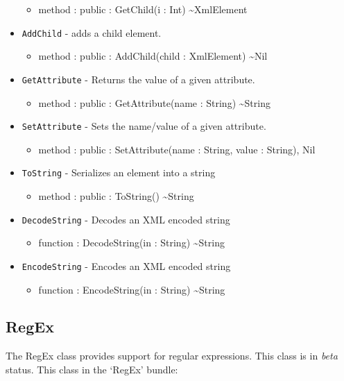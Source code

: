 \documentclass[11pt]{article}
\begin{document}
\begin{itemize}
  \begin{itemize}
  \item method : public : GetChild(i : Int) \textasciitilde XmlElement
  \end{itemize}
\item \texttt{AddChild} - adds a child element.
  \begin{itemize}
  \item method : public : AddChild(child : XmlElement) \textasciitilde Nil
  \end{itemize}
\item \texttt{GetAttribute} - Returns the value of a given attribute.
  \begin{itemize}
  \item method : public : GetAttribute(name : String) \textasciitilde String
  \end{itemize}
\item \texttt{SetAttribute} - Sets the name/value of a given
  attribute.
  \begin{itemize}
  \item method : public : SetAttribute(name : String, value : String),
    Nil
  \end{itemize}
\item \texttt{ToString} - Serializes an element into a string
  \begin{itemize}
  \item method : public : ToString() \textasciitilde String
  \end{itemize}
\item \texttt{DecodeString} - Decodes an XML encoded string
  \begin{itemize}
  \item function : DecodeString(in : String) \textasciitilde String
  \end{itemize}
\item \texttt{EncodeString} - Encodes an XML encoded string
  \begin{itemize}
  \item function : EncodeString(in : String) \textasciitilde String
  \end{itemize}
\end{itemize}

\subsection{RegEx}
The RegEx class provides support for regular expressions.  This class
is in \textit{beta} status. This class in the `RegEx' bundle:
\end{document}
